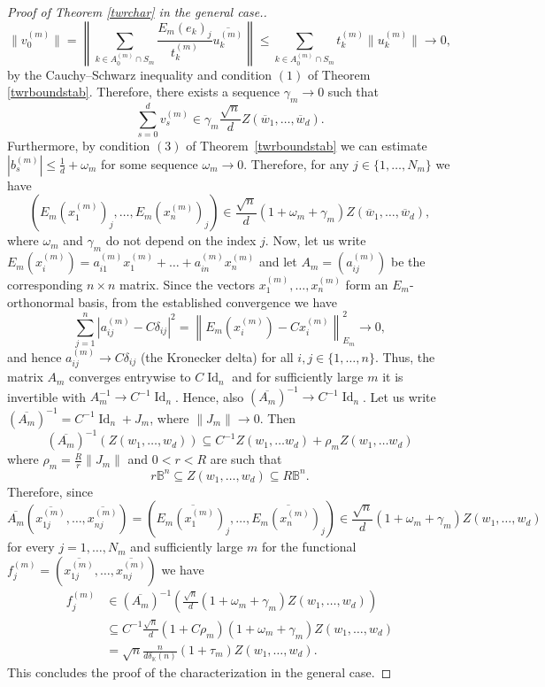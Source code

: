 \documentclass[12pt, reqno]{amsart}
\theoremstyle{definition}
\theoremstyle{remark}
\numberwithin{equation}{section}
\DeclareMathOperator{\id}{Id}
\begin{document}
\begin{proof}[Proof of Theorem \ref{twrchar} in the general case.]
$$\|v_0^{(m)}\| = \left \| \sum_{k \in A_0^{(m)} \cap S_m} \frac{E_m(e_k)_{j}}{t_k^{(m)}}\overline{u_k^{(m)}} \right \| \leq \sum_{k \in A_0^{(m)} \cap S_m} t_k^{(m)} \|u_k^{(m)}\| \to 0,$$
by the Cauchy--Schwarz inequality and condition $(1)$ of Theorem \ref{twrboundstab}. Therefore, there exists a sequence $\gamma_m \to 0$ such that 
$$\sum_{s=0}^{d} v^{(m)}_s \in \gamma_m \frac{\sqrt{n}}{d}  Z(\overline{w}_1, \ldots, \overline{w}_d).$$ 
Furthermore, by condition $(3)$ of Theorem~\ref{twrboundstab} we can estimate $|b_s^{(m)}| \leq \frac{1}{d} + \omega_m$ for some sequence $\omega_m \to 0$. Therefore, for any $j \in \{1, \ldots, N_m\}$ we have
$$ \left( E_m(x_1^{(m)})_{j},\dots,E_m(x_n^{(m)})_{j} \right ) \in \frac{\sqrt{n}}{d}(1+\omega_m+\gamma_m) Z(\overline{w}_1, \ldots, \overline{w}_d),$$
where $\omega_m$ and $\gamma_m$ do not depend on the index $j$. Now, let us write $E_m(x_i^{(m)}) = a^{(m)}_{i1}x_1^{(m)} + \ldots + a^{(m)}_{in}x_n^{(m)}$ and let $A_m=(a^{(m)}_{ij})$ be the corresponding $n \times n$ matrix. Since the vectors $x_1^{(m)}, \ldots, x_n^{(m)}$ form an $E_m$-orthonormal basis, from the established convergence we have
$$\sum_{j=1}^{n} \left | a_{ij}^{(m)} - C \delta_{ij} \right |^2 = \left \| E_m(x_{i}^{(m)}) - Cx_{i}^{(m)}  \right \|^2_{E_m} \to 0,$$
and hence $a^{(m)}_{ij} \to C \delta_{ij}$ (the Kronecker delta) for all $i, j \in \{1, \ldots, n\}$. Thus, the matrix $A_m$ converges entrywise to $C\id_n$ and for sufficiently large $m$ it is invertible with $A_m^{-1} \to C^{-1} \id_n$. Hence, also $(\overline{A_m})^{-1} \to C^{-1} \id_n$. Let us write $(\overline{A_m})^{-1} =C^{-1}\id_n + J_m$, where $\|J_m\| \to 0$. Then
$$(\overline{A_m})^{-1} \left (Z(w_1, \ldots,  w_d)\right ) \subseteq C^{-1}Z(w_1, \ldots w_d) + \rho_m Z(w_1, \ldots w_d)$$
where $\rho_m=\frac{R}{r} \|J_m\|$ and $0<r<R$ are such that 
$$r\mathbb{B}^n \subseteq Z(w_1, \ldots,  w_d) \subseteq R \mathbb{B}^n.$$
Therefore, since
$$\overline{A_m}\left ( \overline{x^{(m)}_{1j}}, \ldots, \overline{x^{(m)}_{nj}} \right ) = \left (\overline{E_m(x_1^{(m)})_{j}}, \ldots, \overline{E_m(x_n^{(m)})_{j}} \right )\in  \frac{\sqrt{n}}{d}(1+\omega_m+\gamma_m) Z(w_1,\dots,w_d)$$
for every $j=1, \ldots, N_m$ and sufficiently large $m$ for the functional $f^{(m)}_j = \left ( \overline{x^{(m)}_{1j}}, \ldots, \overline{x^{(m)}_{nj}} \right )$ we have
\begin{align*}
f^{(m)}_j &\in (\overline{A_m})^{-1} \left ( \frac{\sqrt{n}}{d}(1+\omega_m+\gamma_m) Z(w_1,\dots,w_d) \right ) \\
&\subseteq C^{-1}\frac{\sqrt{n}}{d}(1+C\rho_m)(1+\omega_m+\gamma_m)Z(w_1,\dots,w_d) \\
&=\sqrt{n}\frac{n}{d\delta_{\mathbb{K}}(n)}(1+\tau_m) Z(w_1, \ldots, w_d).
\end{align*}
This concludes the proof of the characterization in the general case.

\end{proof}
\end{document}
